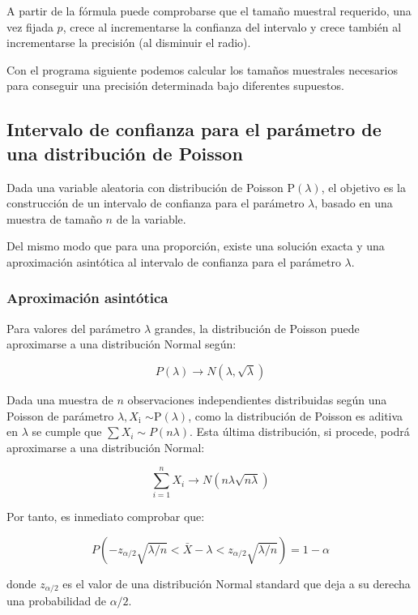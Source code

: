 \documentclass[
]{article}
\begin{document}
A partir de la fórmula puede comprobarse que el tamaño muestral requerido, una vez fijada \(p\), crece al incrementarse la confianza del intervalo y crece también al incrementarse la precisión (al disminuir el radio).

Con el programa siguiente podemos calcular los tamaños muestrales necesarios para conseguir una precisión determinada bajo diferentes supuestos.

\subsection{Intervalo de confianza para el parámetro de una distribución de Poisson}\label{intervalo-de-confianza-para-el-paruxe1metro-de-una-distribuciuxf3n-de-poisson}

Dada una variable aleatoria con distribución de Poisson \(\mathrm{P}(\lambda)\), el objetivo es la construcción de un intervalo de confianza para el parámetro \(\lambda\), basado en una muestra de tamaño \(n\) de la variable.

Del mismo modo que para una proporción, existe una solución exacta y una aproximación asintótica al intervalo de confianza para el parámetro \(\lambda\).

\subsubsection{Aproximación asintótica}\label{aproximaciuxf3n-asintuxf3tica-1}

Para valores del parámetro \(\lambda\) grandes, la distribución de Poisson puede aproximarse a una distribución Normal según:

\[
P(\lambda) \rightarrow N(\lambda, \sqrt{\lambda})
\]

Dada una muestra de \(n\) observaciones independientes distribuidas según una Poisson de parámetro \(\lambda, X_{\mathrm{i}}\) \(\sim \mathrm{P}(\lambda)\), como la distribución de Poisson es aditiva en \(\lambda\) se cumple que \(\sum X_{i} \sim P(n \lambda)\). Esta última distribución, si procede, podrá aproximarse a una distribución Normal:

\[
\sum_{i=1}^{n} X_{i} \rightarrow N(n \lambda \sqrt{n \lambda})
\]

Por tanto, es inmediato comprobar que:

\[
P\left(-z_{\alpha / 2} \sqrt{\lambda / n}<\bar{X}-\lambda<z_{\alpha / 2} \sqrt{\lambda / n}\right)=1-\alpha
\]

donde \(z_{\alpha / 2}\) es el valor de una distribución Normal standard que deja a su derecha una probabilidad de \(\alpha / 2\).
\end{document}
